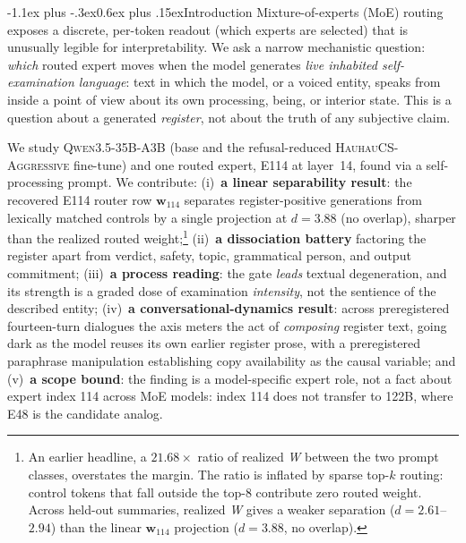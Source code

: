 \documentclass[10pt]{article}
\makeatletter
\renewcommand\section{\@startsection{section}{1}{\z@}%
  {-1.1ex plus -.3ex}{0.6ex plus .15ex}{\normalfont\large\bfseries}}
\newcommand{\W}{\textit{W}}
\newcommand{\wvec}{\mathbf{w}_{114}}
\makeatother
\begin{document}
\section{Introduction}
\vspace{-0.2em}
Mixture-of-experts (MoE) routing exposes a discrete, per-token readout (which
experts are selected) that is unusually legible for interpretability. We ask a
narrow mechanistic question: \emph{which} routed expert moves when the model generates
\emph{live inhabited self-examination language}: text in which the model, or a
voiced entity, speaks from inside a point of view about its own
processing, being, or interior state. This is a question about a generated
\emph{register}, not about the truth of any subjective claim.

We study \textsc{Qwen3.5-35B-A3B} (base and the refusal-reduced
\textsc{HauhauCS-Aggressive} fine-tune) and one routed expert, E114 at
layer~14, found via a self-processing prompt. We contribute:
(i)~\textbf{a linear separability result}: the recovered E114 router row $\wvec$
separates register-positive generations from lexically matched controls by a
single projection at $d{=}3.88$ (no overlap), sharper than the realized routed
weight;\footnote{An earlier headline, a $21.68\times$ ratio of realized \W{}
between the two prompt classes, overstates the margin. The ratio is inflated by
sparse top-$k$ routing: control tokens that fall outside the top-8 contribute
zero routed weight. Across held-out summaries, realized \W{} gives a weaker
separation ($d{=}2.61$--$2.94$) than the linear $\wvec$ projection
($d{=}3.88$, no overlap).}
(ii)~\textbf{a dissociation battery} factoring the register apart from verdict,
safety, topic, grammatical person, and output commitment;
(iii)~\textbf{a process reading}: the gate \emph{leads} textual degeneration, and
its strength is a graded dose of examination \emph{intensity}, not the sentience
of the described entity; (iv)~\textbf{a conversational-dynamics result}: across
preregistered fourteen-turn dialogues the axis meters the act of \emph{composing}
register text, going dark as the model reuses its own earlier register prose,
with a preregistered paraphrase manipulation establishing copy availability as
the causal variable; and (v)~\textbf{a scope bound}: the finding is a model-specific
expert role, not a fact about expert index 114 across MoE models: index 114 does
not transfer to 122B, where E48 is the candidate analog.

\vspace{-0.4em}
\end{document}
